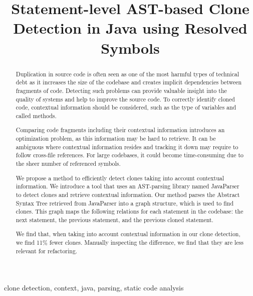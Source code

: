 \documentclass[conference]{IEEEtran}
\begin{document}
\title{Statement-level AST-based Clone Detection in Java using Resolved Symbols}
\author{
}

\maketitle

\thispagestyle{plain}
\pagestyle{plain}

\begin{abstract}
Duplication in source code is often seen as one of the most harmful types of technical debt as it increases the size of the codebase and creates implicit dependencies between fragments of code. Detecting such problems can provide valuable insight into the quality of systems and help to improve the source code. To correctly identify cloned code, contextual information should be considered, such as the type of variables and called methods.

Comparing code fragments including their contextual information introduces an optimization problem, as this information may be hard to retrieve. It can be ambiguous where contextual information resides and tracking it down may require to follow cross-file references. For large codebases, it could become time-consuming due to the sheer number of referenced symbols.

We propose a method to efficiently detect clones taking into account contextual information. We introduce a tool that uses an AST-parsing library named JavaParser to detect clones and retrieve contextual information. Our method parses the Abstract Syntax Tree retrieved from JavaParser into a graph structure, which is used to find clones. This graph maps the following relations for each statement in the codebase: the next statement, the previous statement, and the previous cloned statement.

We find that, when taking into account contextual information in our clone detection, we find 11\% fewer clones. Manually inspecting the difference, we find that they are less relevant for refactoring.
\end{abstract}

\begin{IEEEkeywords}
clone detection, context, java, parsing, static code analysis
\end{IEEEkeywords}
\end{document}
